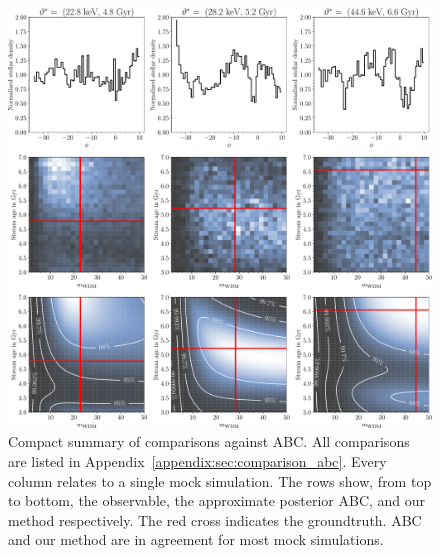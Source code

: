 \documentclass[fleqn,usenatbib]{mnras}
\begin{document}
\begin{figure}
    \centering
    \includegraphics[width=\linewidth]{figures/abc-results-compact-combined}
    \caption{Compact summary of comparisons against ABC.
    All comparisons are listed in Appendix~\ref{appendix:sec:comparison_abc}.
    Every column relates to a single mock simulation. The rows show, from top to bottom,
    the observable, the approximate posterior ABC, and our method respectively.
    The red cross indicates the groundtruth.
    ABC and our method are in agreement for most mock simulations.
    ~~\protect{}}
    \label{fig:abc_results_compact}
\end{figure}
\end{document}
